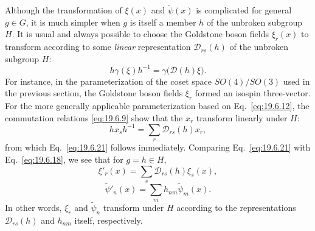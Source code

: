 Although the transformation of $\xi(x)$ and $\widetilde\psi(x)$ is complicated for general $g\in G$, it is much simpler when $g$ is itself a member $h$ of the unbroken subgroup $H$. It is usual and always possible to choose the Goldstone boson fields $\xi_r(x)$ to transform according to some \emph{linear} representation $\mathcal D_{rs}(h)$ of the unbroken subgroup $H$:
\begin{equation}
h\gamma(\xi)h^{-1}
=\gamma\bigl(\mathcal D(h)\xi\bigr).
\tag{19.6.21}\label{eq:19.6.21}
\end{equation}
For instance, in the parameterization of the coset space $SO(4)/SO(3)$ used in the previous section, the Goldstone boson fields $\xi_r$ formed an isospin three-vector. For the more generally applicable parameterization based on Eq.~\eqref{eq:19.6.12}, the commutation relations \eqref{eq:19.6.9} show that the $x_r$ transform linearly under $H$:
\begin{equation}
hx_sh^{-1}=\sum_r\mathcal D_{rs}(h)x_r,
\tag{19.6.22}\label{eq:19.6.22}
\end{equation}
from which Eq.~\eqref{eq:19.6.21} follows immediately. Comparing Eq.~\eqref{eq:19.6.21} with Eq.~\eqref{eq:19.6.18}, we see that for $g=h\in H$,
\begin{equation}
\xi'_r(x)=\sum_s\mathcal D_{rs}(h)\xi_s(x),
\tag{19.6.23}\label{eq:19.6.23}
\end{equation}
\begin{equation}
\widetilde\psi'_n(x)=\sum_mh_{nm}\widetilde\psi_m(x).
\tag{19.6.24}\label{eq:19.6.24}
\end{equation}
In other words, $\xi_r$ and $\widetilde\psi_n$ transform under $H$ according to the representations $\mathcal D_{rs}(h)$ and $h_{nm}$ itself, respectively.

